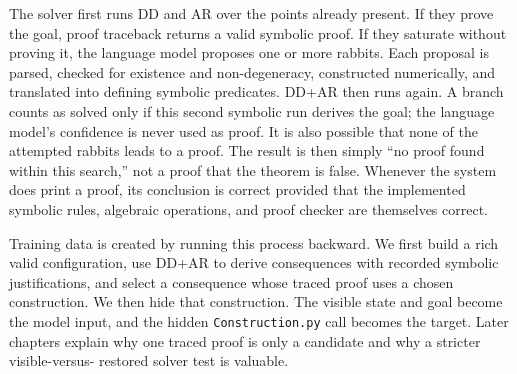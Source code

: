 \documentclass[reqno]{amsart}
\DeclareMathOperator{\1}{\textbf{1}}
\begin{document}
The solver first runs DD and AR over the points already present. If they prove
the goal, proof traceback returns a valid symbolic proof. If they saturate
without proving it, the language model proposes one or more rabbits. Each
proposal is parsed, checked for existence and non-degeneracy, constructed
numerically, and translated into defining symbolic predicates. DD+AR then
runs again. A branch counts as solved only if this second symbolic run derives
the goal; the language model's confidence is never used as proof. It is also
possible that none of the attempted rabbits leads to a proof. The result is
then simply ``no proof found within this search,'' not a proof that the theorem
is false. Whenever the system does print a proof, its conclusion is correct
provided that the implemented symbolic rules, algebraic operations, and proof
checker are themselves correct.

Training data is created by running this process backward. We first build a
rich valid configuration, use DD+AR to derive consequences with recorded
symbolic justifications, and select a
consequence whose traced proof uses a chosen construction. We then hide that
construction. The visible state and goal become the model input, and the
hidden \texttt{Construction.py} call becomes the target. Later chapters explain
why one traced proof is only a candidate and why a stricter visible-versus-
restored solver test is valuable.
\end{document}
